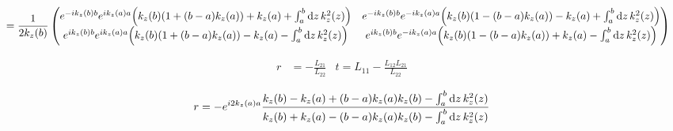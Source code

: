 \begin{align*}
{		} \\
	&=
	\frac{1}{2k_z\pqty{b}} 
	\pmqty{
		e^{-ik_z\pqty{b}b}e^{ik_z\pqty{a}a}\pqty{k_z\pqty{b} \pqty{1 +  \pqty{b-a} k_z\pqty{a} } + k_z\pqty{a} + \int_a^b \dd{z} k_{z}^2\pqty{z} } &
		e^{-ik_z\pqty{b}b}e^{-ik_z\pqty{a}a}\pqty{k_z\pqty{b} \pqty{1 - \pqty{b-a}k_z\pqty{a} } - k_z\pqty{a} + \int_a^b \dd{z} k_{z}^2\pqty{z}  }  \\
		e^{ik_z\pqty{b}b}e^{ik_z\pqty{a}a}\pqty{k_z\pqty{b} \pqty{1 +  \pqty{b-a} k_z\pqty{a} } - k_z\pqty{a} - \int_a^b \dd{z} k_{z}^2\pqty{z}  } &
		e^{ik_z\pqty{b}b}e^{-ik_z\pqty{a}a}\pqty{k_z\pqty{b} \pqty{1 - \pqty{b-a}k_z\pqty{a} } + k_z\pqty{a} - \int_a^b \dd{z} k_{z}^2\pqty{z}  }
		}
\end{align*}

\begin{align*}
	r &= -\frac{L_{21}}{L_{22}} & t = L_{11} - \frac{L_{12}L_{21}}{L_{22}}
\end{align*}

\begin{align*}
	r = -e^{i2k_z\pqty{a}a}\frac{
		k_z\pqty{b} - k_z\pqty{a} + \pqty{b-a} k_z\pqty{a} k_z\pqty{b}  - \int_a^b \dd{z} k_{z}^2\pqty{z}  
		}{
		k_z\pqty{b} + k_z\pqty{a} - \pqty{b-a}k_z\pqty{a} k_z\pqty{b}  - \int_a^b \dd{z} k_{z}^2\pqty{z}  
		}
\end{align*}




